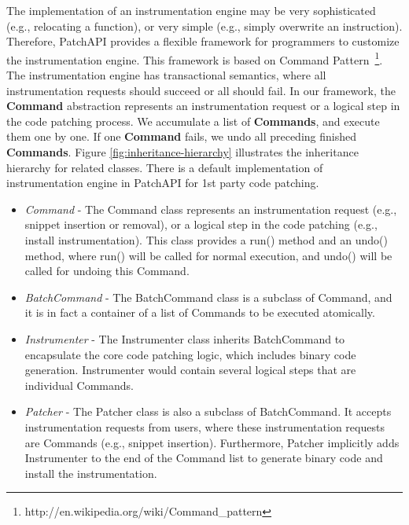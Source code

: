 The implementation of an instrumentation engine may be very sophisticated (e.g.,
relocating a function), or very simple (e.g., simply overwrite an
instruction). Therefore, PatchAPI provides a flexible framework for programmers
to customize the instrumentation engine. This framework is based on Command
Pattern~\footnote{http://en.wikipedia.org/wiki/Command\_pattern}. The
instrumentation engine has transactional semantics, where all instrumentation
requests should succeed or all should fail. In our framework, the
\textbf{Command} abstraction represents an instrumentation request or a logical
step in the code patching process. We accumulate a list of \textbf{Commands},
and execute them one by one. If one \textbf{Command} fails, we undo all
preceding finished \textbf{Commands}. Figure \ref{fig:inheritance-hierarchy} illustrates the
inheritance hierarchy for related classes. There is a default implementation of
instrumentation engine in PatchAPI for 1st party code patching.

\begin{itemize}
\item \emph{Command} - The Command class represents an instrumentation request (e.g.,
    snippet insertion or removal), or a logical step in the code patching (e.g.,
    install instrumentation). This class provides a run() method and an undo()
    method, where run() will be called for normal execution, and undo() will be
    called for undoing this Command.
\item \emph{BatchCommand} - The BatchCommand class is a subclass of Command, and it is
    in fact a container of a list of Commands to be executed atomically.
\item \emph{Instrumenter} - The Instrumenter class inherits BatchCommand to encapsulate
    the core code patching logic, which includes binary code generation.
    Instrumenter would contain several logical steps that are individual
    Commands.
\item \emph{Patcher} - The Patcher class is also a subclass of BatchCommand. It accepts
    instrumentation requests from users, where these instrumentation requests
    are Commands (e.g., snippet insertion). Furthermore, Patcher implicitly adds
    Instrumenter to the end of the Command list to generate binary code and
    install the instrumentation.
\end{itemize}
